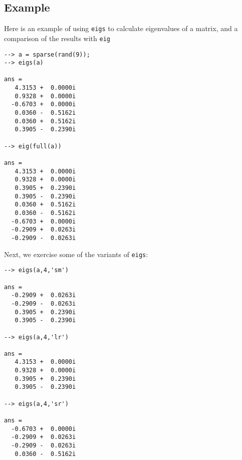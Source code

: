 \subsection{Example}

Here is an example of using \verb|eigs| to calculate eigenvalues
of a matrix, and a comparison of the results with \verb|eig|
\begin{verbatim}
--> a = sparse(rand(9));
--> eigs(a)

ans = 
   4.3153 +  0.0000i 
   0.9328 +  0.0000i 
  -0.6703 +  0.0000i 
   0.0360 -  0.5162i 
   0.0360 +  0.5162i 
   0.3905 -  0.2390i 

--> eig(full(a))

ans = 
   4.3153 +  0.0000i 
   0.9328 +  0.0000i 
   0.3905 +  0.2390i 
   0.3905 -  0.2390i 
   0.0360 +  0.5162i 
   0.0360 -  0.5162i 
  -0.6703 +  0.0000i 
  -0.2909 +  0.0263i 
  -0.2909 -  0.0263i 
\end{verbatim}
Next, we exercise some of the variants of \verb|eigs|:
\begin{verbatim}
--> eigs(a,4,'sm')

ans = 
  -0.2909 +  0.0263i 
  -0.2909 -  0.0263i 
   0.3905 +  0.2390i 
   0.3905 -  0.2390i 

--> eigs(a,4,'lr')

ans = 
   4.3153 +  0.0000i 
   0.9328 +  0.0000i 
   0.3905 +  0.2390i 
   0.3905 -  0.2390i 

--> eigs(a,4,'sr')

ans = 
  -0.6703 +  0.0000i 
  -0.2909 +  0.0263i 
  -0.2909 -  0.0263i 
   0.0360 -  0.5162i 
\end{verbatim}
